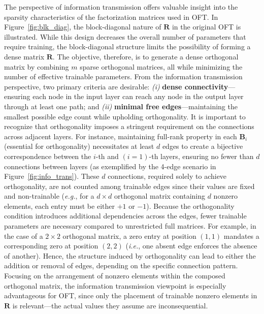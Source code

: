 The perspective of information transmission offers valuable insight into the sparsity characteristics of the factorization matrices used in OFT. In Figure~\ref{fig:blk_diag}, the block-diagonal nature of $\bm{R}$ in the original OFT is illustrated. While this design decreases the overall number of parameters that require training, the block-diagonal structure limits the possibility of forming a dense matrix $\bm{R}$. The objective, therefore, is to generate a dense orthogonal matrix by combining $m$ sparse orthogonal matrices, all while minimizing the number of effective trainable parameters. From the information transmission perspective, two primary criteria are desirable: \emph{(i)} \textbf{dense connectivity}—ensuring each node in the input layer can reach any node in the output layer through at least one path; and \emph{(ii)} \textbf{minimal free edges}—maintaining the smallest possible edge count while upholding orthogonality. It is important to recognize that orthogonality imposes a stringent requirement on the connections across adjacent layers. For instance, maintaining full-rank property in each $\bm{B}_i$ (essential for orthogonality) necessitates at least $d$ edges to create a bijective correspondence between the $i$-th and $(i=1)$-th layers, ensuring no fewer than $d$ connections between layers (as exemplified by the 4-edge scenario in Figure~\ref{fig:info_trans}). These $d$ connections, required solely to achieve orthogonality, are not counted among trainable edges since their values are fixed and non-trainable (\emph{e.g.}, for a $d\times d$ orthogonal matrix containing $d$ nonzero elements, each entry must be either $+1$ or $-1$). Because the orthogonality condition introduces additional dependencies across the edges, fewer trainable parameters are necessary compared to unrestricted full matrices. For example, in the case of a $2\times 2$ orthogonal matrix, a zero entry at position $(1,1)$ mandates a corresponding zero at position $(2,2)$ (\emph{i.e.}, one absent edge enforces the absence of another). Hence, the structure induced by orthogonality can lead to either the addition or removal of edges, depending on the specific connection pattern. Focusing on the arrangement of nonzero elements within the composed orthogonal matrix, the information transmission viewpoint is especially advantageous for OFT, since only the placement of trainable nonzero elements in $\bm{R}$ is relevant—the actual values they assume are inconsequential.

